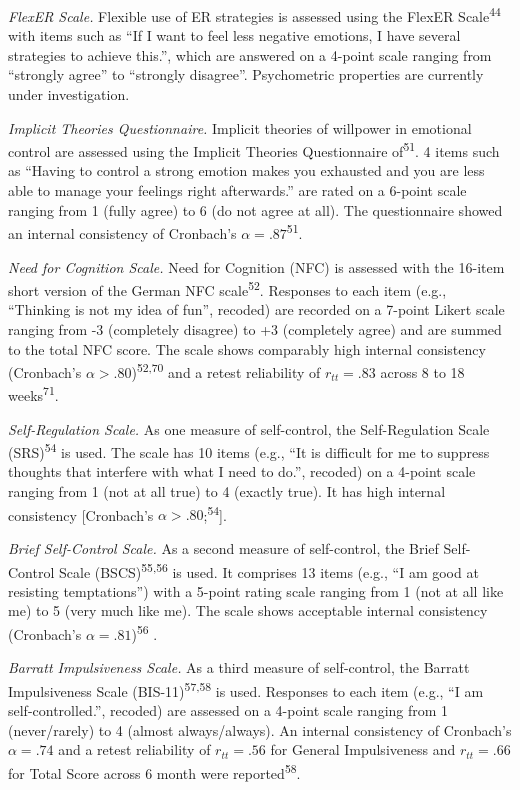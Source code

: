 \documentclass[
  man,floatsintext]{apa6}
\begin{document}
\emph{FlexER Scale.} Flexible use of ER strategies is assessed using the FlexER Scale\textsuperscript{44} with items such as ``If I want to feel less negative emotions, I have several strategies to achieve this.'', which are answered on a 4-point scale ranging from ``strongly agree'' to ``strongly disagree''.
Psychometric properties are currently under investigation.

\emph{Implicit Theories Questionnaire.} Implicit theories of willpower in emotional control are assessed using the Implicit Theories Questionnaire of\textsuperscript{51}.
4 items such as ``Having to control a strong emotion makes you exhausted and you are less able to manage your feelings right afterwards.'' are rated on a 6-point scale ranging from 1 (fully agree) to 6 (do not agree at all).
The questionnaire showed an internal consistency of Cronbach's \(\alpha=.87\)\textsuperscript{51}.

\emph{Need for Cognition Scale.} Need for Cognition (NFC) is assessed with the 16-item short version of the German NFC scale\textsuperscript{52}. Responses to each item (e.g., ``Thinking is not my idea of fun'', recoded) are recorded on a 7-point Likert scale ranging from -3 (completely disagree) to +3 (completely agree) and are summed to the total NFC score. The scale shows comparably high internal consistency (Cronbach's \(\alpha>.80\))\textsuperscript{52,70} and a retest reliability of \(r_{tt}=.83\) across 8 to 18 weeks\textsuperscript{71}.

\emph{Self-Regulation Scale.} As one measure of self-control, the Self-Regulation Scale (SRS)\textsuperscript{54} is used. The scale has 10 items (e.g., ``It is difficult for me to suppress thoughts that interfere with what I need to do.'', recoded) on a 4-point scale ranging from 1 (not at all true) to 4 (exactly true). It has high internal consistency {[}Cronbach's \(\alpha>.80\);\textsuperscript{54}{]}.

\emph{Brief Self-Control Scale.} As a second measure of self-control, the Brief Self-Control Scale (BSCS)\textsuperscript{55,56} is used.
It comprises 13 items (e.g., ``I am good at resisting temptations'') with a 5-point rating scale ranging from 1 (not at all like me) to 5 (very much like me).
The scale shows acceptable internal consistency (Cronbach's \(\alpha=.81\))\textsuperscript{56} .

\emph{Barratt Impulsiveness Scale.} As a third measure of self-control, the Barratt Impulsiveness Scale (BIS-11)\textsuperscript{57,58} is used.
Responses to each item (e.g., ``I am self-controlled.'', recoded) are assessed on a 4-point scale ranging from 1 (never/rarely) to 4 (almost always/always).
An internal consistency of Cronbach's \(\alpha=.74\) and a retest reliability of \(r_{tt}=.56\) for General Impulsiveness and \(r_{tt}=.66\) for Total Score across 6 month were reported\textsuperscript{58}.
\end{document}
